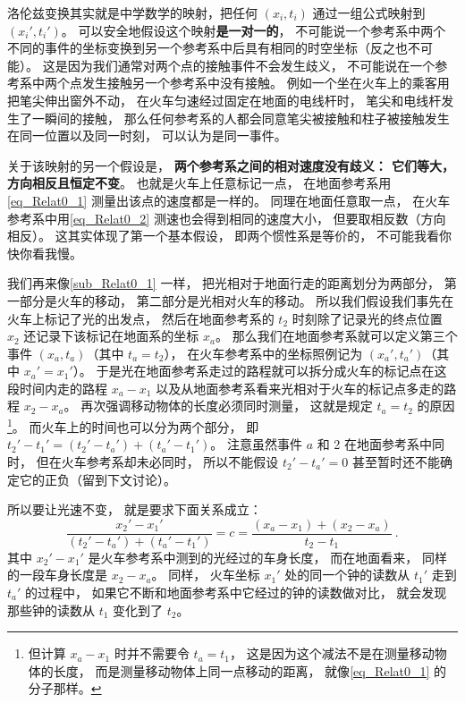 洛伦兹变换其实就是中学数学的映射，把任何 $(x_i, t_i)$ 通过一组公式映射到 $(x_i', t_i')$。 可以安全地假设这个映射\textbf{是一对一的}， 不可能说一个参考系中两个不同的事件的坐标变换到另一个参考系中后具有相同的时空坐标（反之也不可能）。 这是因为我们通常对两个点的接触事件不会发生歧义， 不可能说在一个参考系中两个点发生接触另一个参考系中没有接触。 例如一个坐在火车上的乘客用把笔尖伸出窗外不动， 在火车匀速经过固定在地面的电线杆时， 笔尖和电线杆发生了一瞬间的接触， 那么任何参考系的人都会同意笔尖被接触和柱子被接触发生在同一位置以及同一时刻， 可以认为是同一事件。

关于该映射的另一个假设是， \textbf{两个参考系之间的相对速度没有歧义： 它们等大， 方向相反且恒定不变}。 也就是火车上任意标记一点， 在地面参考系用\autoref{eq_Relat0_1} 测量出该点的速度都是一样的。 同理在地面任意取一点， 在火车参考系中用\autoref{eq_Relat0_2} 测速也会得到相同的速度大小， 但要取相反数（方向相反）。 这其实体现了第一个基本假设， 即两个惯性系是等价的， 不可能我看你快你看我慢。

我们再来像\autoref{sub_Relat0_1} 一样， 把光相对于地面行走的距离划分为两部分， 第一部分是火车的移动， 第二部分是光相对火车的移动。 所以我们假设我们事先在火车上标记了光的出发点， 然后在地面参考系的 $t_2$ 时刻除了记录光的终点位置 $x_2$ 还记录下该标记在地面系的坐标 $x_a$。 那么我们在地面参考系就可以定义第三个事件 $(x_a, t_a)$（其中 $t_a = t_2$）， 在火车参考系中的坐标照例记为 $(x_a', t_a')$（其中 $x_a' = x_1'$）。 于是光在地面参考系走过的路程就可以拆分成火车的标记点在这段时间内走的路程 $x_a - x_1$ 以及从地面参考系看来光相对于火车的标记点多走的路程 $x_2 - x_a$。 再次强调移动物体的长度必须同时测量， 这就是规定 $t_a = t_2$ 的原因\footnote{但计算 $x_a-x_1$ 时并不需要令 $t_a = t_1$， 这是因为这个减法不是在测量移动物体的长度， 而是测量移动物体上同一点移动的距离， 就像\autoref{eq_Relat0_1} 的分子那样。}。 而火车上的时间也可以分为两个部分， 即 $t_2' - t_1' = (t_2' - t_a') + (t_a' - t_1')$。 注意虽然事件 $a$ 和 2 在地面参考系中同时， 但在火车参考系却未必同时， 所以不能假设 $t_2' - t_a' = 0$ 甚至暂时还不能确定它的正负（留到下文讨论）。

所以要让光速不变， 就是要求下面关系成立：
\begin{equation} \label{eq_Relat0_3}
\frac{x_2' - x_1'}{(t_2' - t_a') + (t_a' - t_1')} = c = \frac{(x_a - x_1) + (x_2 - x_a)}{t_2 - t_1}~.
\end{equation}
其中 $x_2' - x_1'$ 是火车参考系中测到的光经过的车身长度， 而在地面看来， 同样的一段车身长度是 $x_2 - x_a$。 同样， 火车坐标 $x_1'$ 处的同一个钟的读数从 $t_1'$ 走到 $t_a'$ 的过程中， 如果它不断和地面参考系中它经过的钟的读数做对比， 就会发现那些钟的读数从 $t_1$ 变化到了 $t_2$。

